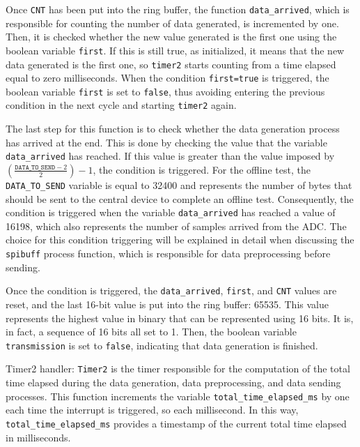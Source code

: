 \documentclass{Configuration_Files/PoliMi3i_thesis}
\begin{document}
Once \texttt{CNT} has been put into the ring buffer, the function \texttt{data\_arrived}, which is responsible for counting the number of data generated, is incremented by one. Then, it is checked whether the new value generated is the first one using the boolean variable \texttt{first}. If this is still true, as initialized, it means that the new data generated is the first one, so \texttt{timer2} starts counting from a time elapsed equal to zero milliseconds. When the condition \texttt{first=true} is triggered, the boolean variable \texttt{first} is set to \texttt{false}, thus avoiding entering the previous condition in the next cycle and starting \texttt{timer2} again.

The last step for this function is to check whether the data generation process has arrived at the end. This is done by checking the value that the variable \texttt{data\_arrived} has reached. If this value is greater than the value imposed by \(\left(\frac{\texttt{DATA\_TO\_SEND} - 2}{2}\right) - 1\), the condition is triggered. For the offline test, the \texttt{DATA\_TO\_SEND} variable is equal to 32400 and represents the number of bytes that should be sent to the central device to complete an offline test. Consequently, the condition is triggered when the variable \texttt{data\_arrived} has reached a value of 16198, which also represents the number of samples arrived from the ADC. The choice for this condition triggering will be explained in detail when discussing the \texttt{spibuff} process function, which is responsible for data preprocessing before sending.

Once the condition is triggered, the \texttt{data\_arrived}, \texttt{first}, and \texttt{CNT} values are reset, and the last 16-bit value is put into the ring buffer: 65535. This value represents the highest value in binary that can be represented using 16 bits. It is, in fact, a sequence of 16 bits all set to 1. Then, the boolean variable \texttt{transmission} is set to \texttt{false}, indicating that data generation is finished.

Timer2 handler:
\texttt{Timer2} is the timer responsible for the computation of the total time elapsed during the data generation, data preprocessing, and data sending processes. This function increments the variable \texttt{total\_time\_elapsed\_ms} by one each time the interrupt is triggered, so each millisecond. In this way, \texttt{total\_time\_elapsed\_ms} provides a timestamp of the current total time elapsed in milliseconds.
\end{document}
